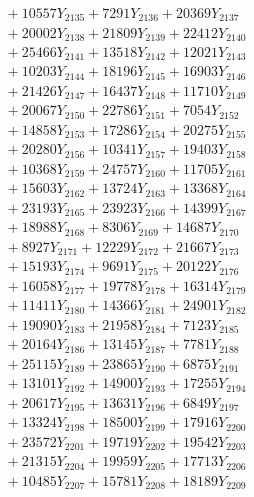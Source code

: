 \documentclass[a4paper,10pt]{article}
\begin{document}
{\begin{align}
&\;  + 10557 Y_{2135} + 7291 Y_{2136} + 20369 Y_{2137} \\[0.3ex]
&\;  + 20002 Y_{2138} + 21809 Y_{2139} + 22412 Y_{2140} \\[0.3ex]
&\;  + 25466 Y_{2141} + 13518 Y_{2142} + 12021 Y_{2143} \\[0.3ex]
&\;  + 10203 Y_{2144} + 18196 Y_{2145} + 16903 Y_{2146} \\[0.3ex]
&\;  + 21426 Y_{2147} + 16437 Y_{2148} + 11710 Y_{2149} \\[0.3ex]
&\;  + 20067 Y_{2150} + 22786 Y_{2151} + 7054 Y_{2152} \\[0.3ex]
&\;  + 14858 Y_{2153} + 17286 Y_{2154} + 20275 Y_{2155} \\[0.3ex]
&\;  + 20280 Y_{2156} + 10341 Y_{2157} + 19403 Y_{2158} \\[0.5ex]\allowbreak
&\;  + 10368 Y_{2159} + 24757 Y_{2160} + 11705 Y_{2161} \\[0.3ex]
&\;  + 15603 Y_{2162} + 13724 Y_{2163} + 13368 Y_{2164} \\[0.3ex]
&\;  + 23193 Y_{2165} + 23923 Y_{2166} + 14399 Y_{2167} \\[0.3ex]
&\;  + 18988 Y_{2168} + 8306 Y_{2169} + 14687 Y_{2170} \\[0.3ex]
&\;  + 8927 Y_{2171} + 12229 Y_{2172} + 21667 Y_{2173} \\[0.3ex]
&\;  + 15193 Y_{2174} + 9691 Y_{2175} + 20122 Y_{2176} \\[0.3ex]
&\;  + 16058 Y_{2177} + 19778 Y_{2178} + 16314 Y_{2179} \\[0.3ex]
&\;  + 11411 Y_{2180} + 14366 Y_{2181} + 24901 Y_{2182} \\[0.3ex]
&\;  + 19090 Y_{2183} + 21958 Y_{2184} + 7123 Y_{2185} \\[0.3ex]
&\;  + 20164 Y_{2186} + 13145 Y_{2187} + 7781 Y_{2188} \\[0.5ex]\allowbreak
&\;  + 25115 Y_{2189} + 23865 Y_{2190} + 6875 Y_{2191} \\[0.3ex]
&\;  + 13101 Y_{2192} + 14900 Y_{2193} + 17255 Y_{2194} \\[0.3ex]
&\;  + 20617 Y_{2195} + 13631 Y_{2196} + 6849 Y_{2197} \\[0.3ex]
&\;  + 13324 Y_{2198} + 18500 Y_{2199} + 17916 Y_{2200} \\[0.3ex]
&\;  + 23572 Y_{2201} + 19719 Y_{2202} + 19542 Y_{2203} \\[0.3ex]
&\;  + 21315 Y_{2204} + 19959 Y_{2205} + 17713 Y_{2206} \\[0.3ex]
&\;  + 10485 Y_{2207} + 15781 Y_{2208} + 18189 Y_{2209} \\[0.3ex]

\end{align}}
\end{document}
